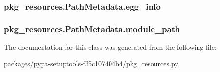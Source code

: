\subsubsection[{egg\+\_\+info}]{\setlength{\rightskip}{0pt plus 5cm}pkg\+\_\+resources.\+Path\+Metadata.\+egg\+\_\+info}\label{classpkg__resources_1_1PathMetadata_a61a445362a417dfb470ebee020a73762}
\hypertarget{classpkg__resources_1_1PathMetadata_a32d4f91934149b639e6b3e88e802bd9f}{}
\subsubsection[{module\+\_\+path}]{\setlength{\rightskip}{0pt plus 5cm}pkg\+\_\+resources.\+Path\+Metadata.\+module\+\_\+path}\label{classpkg__resources_1_1PathMetadata_a32d4f91934149b639e6b3e88e802bd9f}


The documentation for this class was generated from the following file\+:\begin{DoxyCompactItemize}
\item 
packages/pypa-\/setuptools-\/f35c107404b4/\hyperlink{pkg__resources_8py}{pkg\+\_\+resources.\+py}\end{DoxyCompactItemize}
